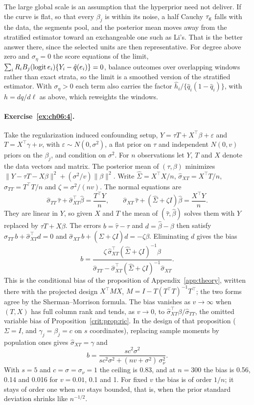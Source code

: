 The large global scale is an assumption that the hyperprior need not deliver. If the curve is flat, so that every $\beta_j$ is within its noise, a half Cauchy $\tau_{\mathrm{g}}$ falls with the data, the segments pool, and the posterior mean moves away from the stratified estimator toward an exchangeable one such as Li's. That is the better answer there, since the selected units are then representative. For degree above zero and $\sigma_\eta = 0$ the score equations of the limit, $\sum_i R_iB_j(\operatorname{logit} e_i)\{Y_i - \hat q(e_i)\} = 0$, balance outcomes over overlapping windows rather than exact strata, so the limit is a smoothed version of the stratified estimator. With $\sigma_\eta > 0$ each term also carries the factor $\hat h_i/\{\hat q_i(1 - \hat q_i)\}$, with $h = dq/d\ell$ as above, which reweights the windows.

\paragraph{Exercise~\ref{ex:ch06:4}.} Take the regularization induced confounding setup, $Y = \tau T + X^\top\beta + \varepsilon$ and $T = X^\top\gamma + \nu$, with $\varepsilon \sim N(0, \sigma^2)$, a flat prior on $\tau$ and independent $N(0, v)$ priors on the $\beta_j$, and condition on $\sigma^2$. For $n$ observations let $Y$, $T$ and $X$ denote the data vectors and matrix. The posterior mean of $(\tau, \beta)$ minimizes $\|Y - \tau T - X\beta\|^2 + (\sigma^2/v)\|\beta\|^2$. Write $\hat\Sigma = X^\top X/n$, $\hat\sigma_{XT} = X^\top T/n$, $\hat\sigma_{TT} = T^\top T/n$ and $\zeta = \sigma^2/(nv)$. The normal equations are
\[
\hat\sigma_{TT}\,\hat\tau + \hat\sigma_{XT}^\top\hat\beta = \frac{T^\top Y}{n}, \qquad \hat\sigma_{XT}\,\hat\tau + (\hat\Sigma + \zeta I)\hat\beta = \frac{X^\top Y}{n}.
\]
They are linear in $Y$, so given $X$ and $T$ the mean of $(\hat\tau, \hat\beta)$ solves them with $Y$ replaced by $\tau T + X\beta$. The errors $b = \hat\tau - \tau$ and $d = \hat\beta - \beta$ then satisfy $\hat\sigma_{TT}\,b + \hat\sigma_{XT}^\top d = 0$ and $\hat\sigma_{XT}\,b + (\hat\Sigma + \zeta I)d = -\zeta\beta$. Eliminating $d$ gives the bias
\[
b = \frac{\zeta\,\hat\sigma_{XT}^\top(\hat\Sigma + \zeta I)^{-1}\beta}{\hat\sigma_{TT} - \hat\sigma_{XT}^\top(\hat\Sigma + \zeta I)^{-1}\hat\sigma_{XT}}.
\]
This is the conditional bias of the proposition of Appendix~\ref{app:theory}, written there with the projected design $X^\top MX$, $M = I - T(T^\top T)^{-1}T^\top$; the two forms agree by the Sherman--Morrison formula. The bias vanishes as $v \to \infty$ when $(T, X)$ has full column rank and tends, as $v \to 0$, to $\hat\sigma_{XT}^\top\beta/\hat\sigma_{TT}$, the omitted variable bias of Proposition~\ref{crit:prop:ric}. In the design of that proposition ($\Sigma = I$, and $\gamma_j = \beta_j = c$ on $s$ coordinates), replacing sample moments by population ones gives $\hat\sigma_{XT} = \gamma$ and
\[
b = \frac{sc^2\sigma^2}{sc^2\sigma^2 + (nv + \sigma^2)\,\sigma_\nu^2}.
\]
With $s = 5$ and $c = \sigma = \sigma_\nu = 1$ the ceiling is 0.83, and at $n = 300$ the bias is 0.56, 0.14 and 0.016 for $v = 0.01$, 0.1 and 1. For fixed $v$ the bias is of order $1/n$; it stays of order one when $nv$ stays bounded, that is, when the prior standard deviation shrinks like $n^{-1/2}$.

